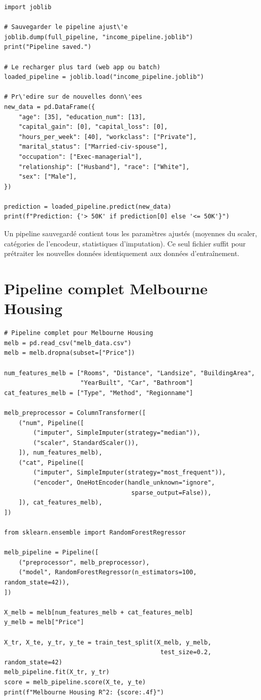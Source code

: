 \begin{verbatim}
import joblib

# Sauvegarder le pipeline ajust\'e
joblib.dump(full_pipeline, "income_pipeline.joblib")
print("Pipeline saved.")

# Le recharger plus tard (web app ou batch)
loaded_pipeline = joblib.load("income_pipeline.joblib")

# Pr\'edire sur de nouvelles donn\'ees
new_data = pd.DataFrame({
    "age": [35], "education_num": [13],
    "capital_gain": [0], "capital_loss": [0],
    "hours_per_week": [40], "workclass": ["Private"],
    "marital_status": ["Married-civ-spouse"],
    "occupation": ["Exec-managerial"],
    "relationship": ["Husband"], "race": ["White"],
    "sex": ["Male"],
})

prediction = loaded_pipeline.predict(new_data)
print(f"Prediction: {'> 50K' if prediction[0] else '<= 50K'}")
\end{verbatim}

\begin{preprocesstip}
Un pipeline sauvegard\'e contient tous les param\`etres ajust\'es (moyennes du scaler, cat\'egories de l'encodeur, statistiques d'imputation). Ce seul fichier suffit pour pr\'etraiter les nouvelles donn\'ees identiquement aux donn\'ees d'entra\^inement.
\end{preprocesstip}

\section{Pipeline complet Melbourne Housing}

\begin{verbatim}
# Pipeline complet pour Melbourne Housing
melb = pd.read_csv("melb_data.csv")
melb = melb.dropna(subset=["Price"])

num_features_melb = ["Rooms", "Distance", "Landsize", "BuildingArea",
                     "YearBuilt", "Car", "Bathroom"]
cat_features_melb = ["Type", "Method", "Regionname"]

melb_preprocessor = ColumnTransformer([
    ("num", Pipeline([
        ("imputer", SimpleImputer(strategy="median")),
        ("scaler", StandardScaler()),
    ]), num_features_melb),
    ("cat", Pipeline([
        ("imputer", SimpleImputer(strategy="most_frequent")),
        ("encoder", OneHotEncoder(handle_unknown="ignore",
                                   sparse_output=False)),
    ]), cat_features_melb),
])

from sklearn.ensemble import RandomForestRegressor

melb_pipeline = Pipeline([
    ("preprocessor", melb_preprocessor),
    ("model", RandomForestRegressor(n_estimators=100, random_state=42)),
])

X_melb = melb[num_features_melb + cat_features_melb]
y_melb = melb["Price"]

X_tr, X_te, y_tr, y_te = train_test_split(X_melb, y_melb,
                                           test_size=0.2, random_state=42)
melb_pipeline.fit(X_tr, y_tr)
score = melb_pipeline.score(X_te, y_te)
print(f"Melbourne Housing R^2: {score:.4f}")
\end{verbatim}

